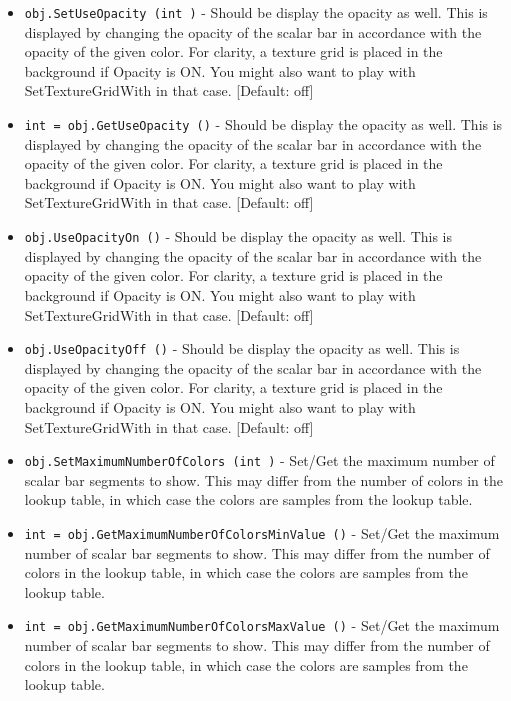 \begin{itemize}
\item  \verb|obj.SetUseOpacity (int )| -  Should be display the opacity as well. This is displayed by changing
 the opacity of the scalar bar in accordance with the opacity of the
 given color. For clarity, a texture grid is placed in the background
 if Opacity is ON. You might also want to play with SetTextureGridWith
 in that case. [Default: off]

\item  \verb|int = obj.GetUseOpacity ()| -  Should be display the opacity as well. This is displayed by changing
 the opacity of the scalar bar in accordance with the opacity of the
 given color. For clarity, a texture grid is placed in the background
 if Opacity is ON. You might also want to play with SetTextureGridWith
 in that case. [Default: off]

\item  \verb|obj.UseOpacityOn ()| -  Should be display the opacity as well. This is displayed by changing
 the opacity of the scalar bar in accordance with the opacity of the
 given color. For clarity, a texture grid is placed in the background
 if Opacity is ON. You might also want to play with SetTextureGridWith
 in that case. [Default: off]

\item  \verb|obj.UseOpacityOff ()| -  Should be display the opacity as well. This is displayed by changing
 the opacity of the scalar bar in accordance with the opacity of the
 given color. For clarity, a texture grid is placed in the background
 if Opacity is ON. You might also want to play with SetTextureGridWith
 in that case. [Default: off]

\item  \verb|obj.SetMaximumNumberOfColors (int )| -  Set/Get the maximum number of scalar bar segments to show. This may
 differ from the number of colors in the lookup table, in which case
 the colors are samples from the lookup table.

\item  \verb|int = obj.GetMaximumNumberOfColorsMinValue ()| -  Set/Get the maximum number of scalar bar segments to show. This may
 differ from the number of colors in the lookup table, in which case
 the colors are samples from the lookup table.

\item  \verb|int = obj.GetMaximumNumberOfColorsMaxValue ()| -  Set/Get the maximum number of scalar bar segments to show. This may
 differ from the number of colors in the lookup table, in which case
 the colors are samples from the lookup table.


\end{itemize}
